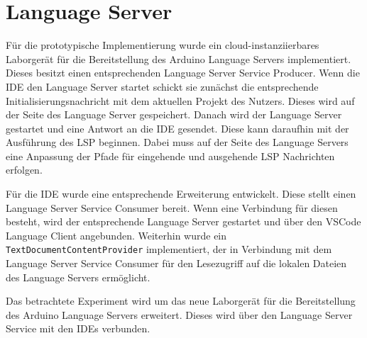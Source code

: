 \section{Language Server}\label{section:prototypische-implementierung:language-server}


Für die prototypische Implementierung wurde ein cloud-instanziierbares Laborgerät für die Bereitstellung des Arduino Language Servers \cite{noauthor_arduino-language-server_2025} implementiert. Dieses besitzt einen entsprechenden Language Server Service Producer. Wenn die IDE den Language Server startet schickt sie zunächst die entsprechende Initialisierungsnachricht mit dem aktuellen Projekt des Nutzers. Dieses wird auf der Seite des Language Server gespeichert. Danach wird der Language Server gestartet und eine Antwort an die IDE gesendet. Diese kann daraufhin mit der Ausführung des \ac{LSP} beginnen. Dabei muss auf der Seite des Language Servers eine Anpassung der Pfade für eingehende und ausgehende \ac{LSP} Nachrichten erfolgen.

Für die IDE wurde eine entsprechende Erweiterung entwickelt. Diese stellt einen Language Server Service Consumer bereit. Wenn eine Verbindung für diesen besteht, wird der entsprechende Language Server gestartet und über den VSCode Language Client angebunden. Weiterhin wurde ein \texttt{TextDocumentContentProvider} implementiert, der in Verbindung mit dem Language Server Service Consumer für den Lesezugriff auf die lokalen Dateien des Language Servers ermöglicht.

Das betrachtete Experiment wird um das neue Laborgerät für die Bereitstellung des Arduino Language Servers erweitert. Dieses wird über den Language Server Service mit den IDEs verbunden.